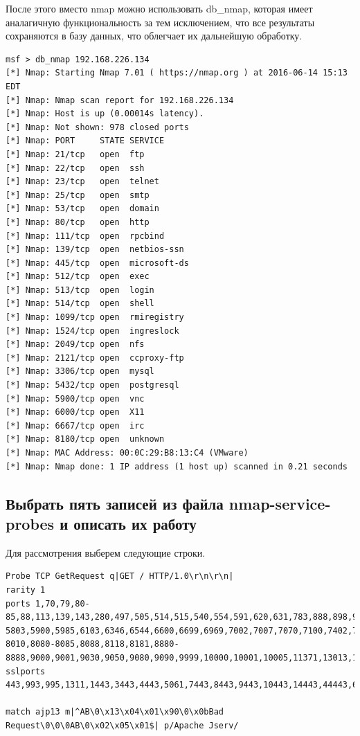 \documentclass[10pt,a4paper,titlepage]{article}
\begin{document}
После этого вместо nmap можно использовать db\_nmap, которая имеет аналагичную функциональность за тем исключением, что все результаты сохраняются в базу данных, что облегчает их дальнейшую обработку.
\begin{verbatim}
msf > db_nmap 192.168.226.134 
[*] Nmap: Starting Nmap 7.01 ( https://nmap.org ) at 2016-06-14 15:13 EDT
[*] Nmap: Nmap scan report for 192.168.226.134
[*] Nmap: Host is up (0.00014s latency).
[*] Nmap: Not shown: 978 closed ports
[*] Nmap: PORT     STATE SERVICE
[*] Nmap: 21/tcp   open  ftp
[*] Nmap: 22/tcp   open  ssh
[*] Nmap: 23/tcp   open  telnet
[*] Nmap: 25/tcp   open  smtp
[*] Nmap: 53/tcp   open  domain
[*] Nmap: 80/tcp   open  http
[*] Nmap: 111/tcp  open  rpcbind
[*] Nmap: 139/tcp  open  netbios-ssn
[*] Nmap: 445/tcp  open  microsoft-ds
[*] Nmap: 512/tcp  open  exec
[*] Nmap: 513/tcp  open  login
[*] Nmap: 514/tcp  open  shell
[*] Nmap: 1099/tcp open  rmiregistry
[*] Nmap: 1524/tcp open  ingreslock
[*] Nmap: 2049/tcp open  nfs
[*] Nmap: 2121/tcp open  ccproxy-ftp
[*] Nmap: 3306/tcp open  mysql
[*] Nmap: 5432/tcp open  postgresql
[*] Nmap: 5900/tcp open  vnc
[*] Nmap: 6000/tcp open  X11
[*] Nmap: 6667/tcp open  irc
[*] Nmap: 8180/tcp open  unknown
[*] Nmap: MAC Address: 00:0C:29:B8:13:C4 (VMware)
[*] Nmap: Nmap done: 1 IP address (1 host up) scanned in 0.21 seconds
\end{verbatim}

\subsection{Выбрать пять записей из файла nmap-service-probes и описать их работу}
Для рассмотрения выберем следующие строки.
\begin{verbatim}
Probe TCP GetRequest q|GET / HTTP/1.0\r\n\r\n|
rarity 1
ports 1,70,79,80-85,88,113,139,143,280,497,505,514,515,540,554,591,620,631,783,888,898,900,901,1026,1080,1042,1214,1220,1234,1314,1344,1503,1610,1611,1830,1900,2001,2002,2030,2064,2160,2306,2396,2525,2715,2869,3000,3002,3052,3128,3280,3372,3531,3689,3872,4000,4444,4567,4660,4711,5000,5427,5060,5222,5269,5280,5432,5800-5803,5900,5985,6103,6346,6544,6600,6699,6969,7002,7007,7070,7100,7402,7776,8000-8010,8080-8085,8088,8118,8181,8880-8888,9000,9001,9030,9050,9080,9090,9999,10000,10001,10005,11371,13013,13666,13722,14534,15000,17988,18264,31337,40193,50000,55555
sslports 443,993,995,1311,1443,3443,4443,5061,7443,8443,9443,10443,14443,44443,60443

match ajp13 m|^AB\0\x13\x04\x01\x90\0\x0bBad Request\0\0\0AB\0\x02\x05\x01$| p/Apache Jserv/
\end{verbatim}
\end{document}
